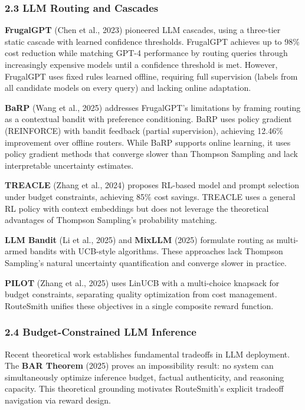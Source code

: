 \documentclass[
]{article}
\begin{document}
\hypertarget{llm-routing-and-cascades}{%
\subsubsection{2.3 LLM Routing and
Cascades}\label{llm-routing-and-cascades}}

\textbf{FrugalGPT} (Chen et al., 2023) pioneered LLM cascades, using a
three-tier static cascade with learned confidence thresholds. FrugalGPT
achieves up to 98\% cost reduction while matching GPT-4 performance by
routing queries through increasingly expensive models until a confidence
threshold is met. However, FrugalGPT uses fixed rules learned offline,
requiring full supervision (labels from all candidate models on every
query) and lacking online adaptation.

\textbf{BaRP} (Wang et al., 2025) addresses FrugalGPT's limitations by
framing routing as a contextual bandit with preference conditioning.
BaRP uses policy gradient (REINFORCE) with bandit feedback (partial
supervision), achieving 12.46\% improvement over offline routers. While
BaRP supports online learning, it uses policy gradient methods that
converge slower than Thompson Sampling and lack interpretable
uncertainty estimates.

\textbf{TREACLE} (Zhang et al., 2024) proposes RL-based model and prompt
selection under budget constraints, achieving 85\% cost savings. TREACLE
uses a general RL policy with context embeddings but does not leverage
the theoretical advantages of Thompson Sampling's probability matching.

\textbf{LLM Bandit} (Li et al., 2025) and \textbf{MixLLM} (2025)
formulate routing as multi-armed bandits with UCB-style algorithms.
These approaches lack Thompson Sampling's natural uncertainty
quantification and converge slower in practice.

\textbf{PILOT} (Zhang et al., 2025) uses LinUCB with a multi-choice
knapsack for budget constraints, separating quality optimization from
cost management. RouteSmith unifies these objectives in a single
composite reward function.

\hypertarget{budget-constrained-llm-inference}{%
\subsubsection{2.4 Budget-Constrained LLM
Inference}\label{budget-constrained-llm-inference}}

Recent theoretical work establishes fundamental tradeoffs in LLM
deployment. The \textbf{BAR Theorem} (2025) proves an impossibility
result: no system can simultaneously optimize inference budget, factual
authenticity, and reasoning capacity. This theoretical grounding
motivates RouteSmith's explicit tradeoff navigation via reward design.
\end{document}
